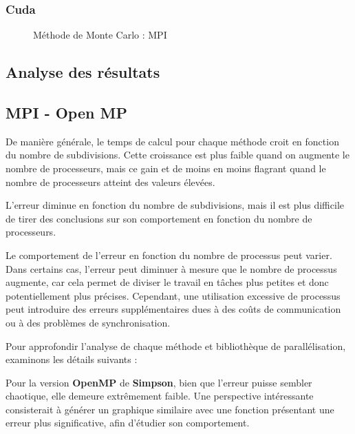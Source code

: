 \documentclass[10pt,a4paper]{article}
\begin{document}
\subsubsection{Cuda}
\begin{figure}[H]
    \centering

    \hfill %
  
    \caption{Méthode de Monte Carlo : MPI}
    \label{fig:MCMPI}
  \end{figure}


\subsection{Analyse des résultats} \label{sec:analyse}
\subsection*{MPI - Open MP}
De manière générale, le temps de calcul pour chaque méthode croit en fonction du nombre de subdivisions. Cette croissance est plus faible quand on augmente le nombre de processeurs, mais ce gain et de moins en moins flagrant quand le nombre de processeurs atteint des valeurs élevées.

L'erreur diminue en fonction du nombre de subdivisions, mais il est plus difficile de tirer des conclusions sur son comportement en fonction du nombre de processeurs. 

Le comportement de l'erreur en fonction du nombre de processus peut varier.
Dans certains cas, l'erreur peut diminuer à mesure que le nombre de processus augmente, car cela permet de diviser le travail en tâches plus petites et donc potentiellement plus précises.
Cependant, une utilisation excessive de processus peut introduire des erreurs supplémentaires dues à des coûts de communication ou à des problèmes de synchronisation.

Pour approfondir l'analyse de chaque méthode et bibliothèque de parallélisation, examinons les détails suivants :

Pour la version \textbf{OpenMP} de \textbf{Simpson}, bien que l'erreur puisse sembler chaotique, elle demeure extrêmement faible. Une perspective intéressante consisterait à générer un graphique similaire avec une fonction présentant une erreur plus significative, afin d'étudier son comportement.
\end{document}
